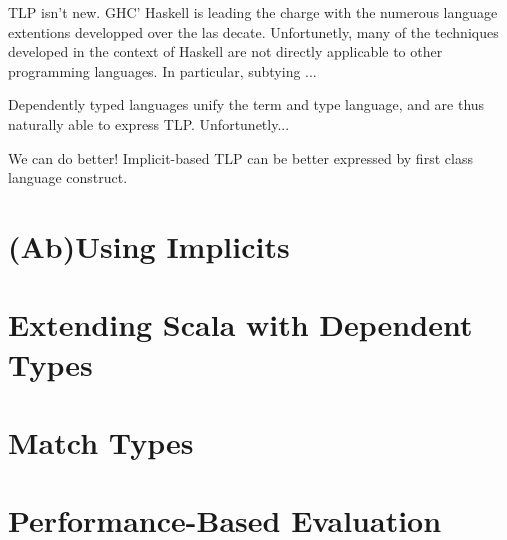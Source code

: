TLP isn't new. GHC' Haskell is leading the charge with the numerous language extentions developped over the las decate. Unfortunetly, many of the techniques developed in the context of Haskell are not directly applicable to other programming languages. In particular, subtying ...

Dependently typed languages unify the term and type language, and are thus naturally able to express TLP. Unfortunetly...

We can do better! Implicit-based TLP can be better expressed by first class language construct.




\lipsum[1]

\chapter{(Ab)Using Implicits}
\label{chap:ab-using-implicits}
\lipsum[1]

\chapter{Extending Scala with Dependent Types}
\label{chap:extending-scala-with-dependent-types}
\lipsum[1]

\chapter{Match Types}
\label{chap:match-types}


\chapter{Performance-Based Evaluation}
\label{chap:performance-based-evaluation}
\lipsum[1]

